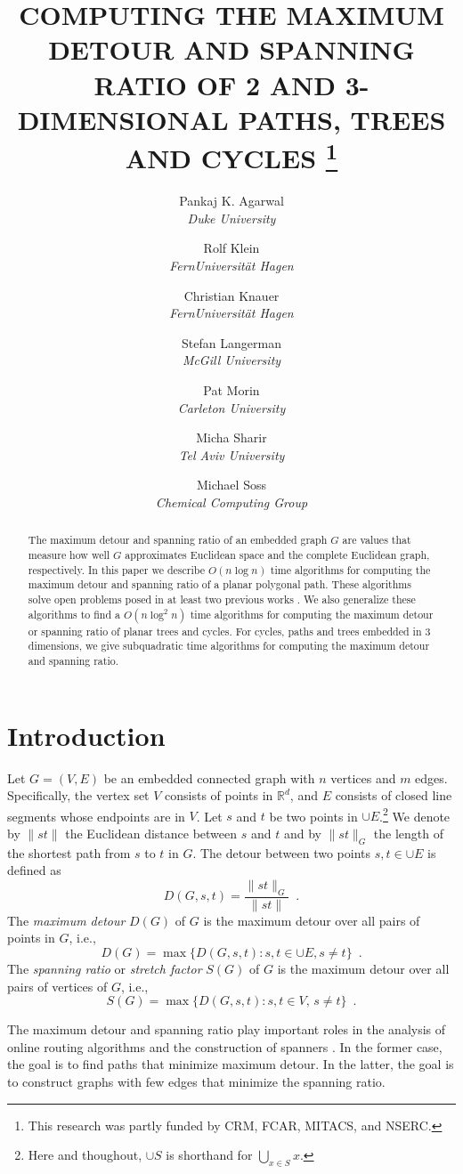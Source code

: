 \documentclass[lotsofwhite]{patmorin}
\title{\MakeUppercase{Computing the Maximum Detour and Spanning 
	Ratio of 2 and 3-Dimensional Paths, Trees and Cycles}%
	\thanks{This research was partly funded by CRM, FCAR, MITACS, 
		and NSERC.}}
\author{Pankaj K. Agarwal \\ \textit{Duke University} \and
	Rolf Klein \\ \textit{FernUniversit\"at Hagen} \and
	Christian Knauer \\ \textit{FernUniversit\"at Hagen} \and
	Stefan Langerman \\ \textit{McGill University} \and
	Pat Morin \\ \textit{Carleton University} \and
	Micha Sharir \\ \textit{Tel Aviv University} \and
	Michael Soss \\ \textit{Chemical Computing Group}}
\date{}
\begin{document}
\maketitle

\begin{abstract}
The maximum detour and spanning ratio of an embedded graph $G$ are
values that measure how well $G$ approximates Euclidean space and the
complete Euclidean graph, respectively.  In this paper we describe
$O(n\log n)$ time algorithms for computing the maximum detour and
spanning ratio of a planar polygonal path.  These algorithms solve
open problems posed in at least two previous works \cite{ekll01,ns01}.
We also generalize these algorithms to find a $O(n\log^2 n)$ time
algorithms for computing the maximum detour or spanning ratio of
planar trees and cycles.  For cycles, paths and trees embedded in 3
dimensions, we give subquadratic time algorithms for computing the
maximum detour and spanning ratio.
\end{abstract}

\section{Introduction}

Let $G=(V,E)$ be an embedded connected graph with $n$ vertices and $m$
edges.  Specifically, the vertex set $V$ consists of points in
$\mathbb{R}^d$, and $E$ consists of closed line segments whose
endpoints are in $V$. Let $s$ and $t$ be two points in $\cup
E$.\footnote{Here and thoughout, $\cup S$ is shorthand for
$\bigcup_{x\in S} x$.}  We denote by $\|st\|$ the Euclidean distance
between $s$ and $t$ and by $\|st\|_G$ the length of the shortest path
from $s$ to $t$ in $G$.  The detour between two points $s,t\in\cup E$
is defined as
\[
	D(G,s,t) = \frac{\|st\|_G}{\|st\|} \enspace .
\]
The \emph{maximum detour} $D(G)$ of $G$ is the maximum detour
over all pairs of points in $G$, i.e.,
\[
       D(G) = \max\{ D(G,s,t): {s,t\in\cup E, 
	s\neq t} \} \enspace .
\]
The \emph{spanning ratio} or \emph{stretch factor} $S(G)$ of $G$ is
the maximum detour over all pairs of vertices of $G$, i.e.,
\[
  	S(G) = \max\{ D(G,s,t) : {s,t\in V,\, s\neq t}\} \enspace .
\]

The maximum detour and spanning ratio play important roles in the
analysis of online routing algorithms \cite{bm01,ik95} and the
construction of spanners \cite{e99}.  In the former case, the goal is
to find paths that minimize maximum detour.  In the latter, the goal
is to construct graphs with few edges that minimize the spanning
ratio.
\end{document}
